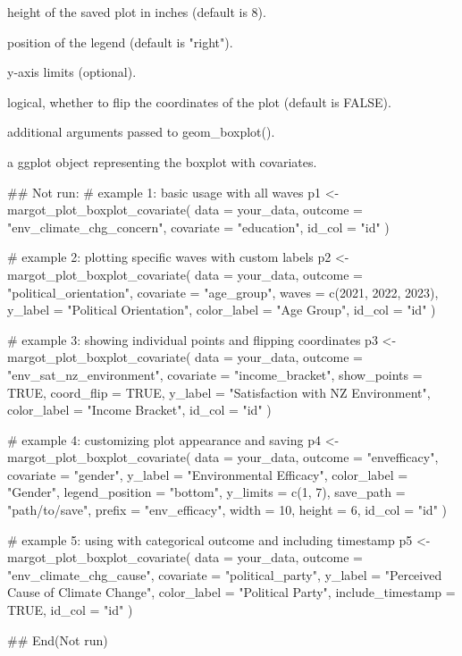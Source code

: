 \documentclass[a4paper]{book}
\begin{document}
\begin{Arguments}
\begin{ldescription}
\item[\code{height}] height of the saved plot in inches (default is 8).

\item[\code{legend\_position}] position of the legend (default is "right").

\item[\code{y\_limits}] y-axis limits (optional).

\item[\code{coord\_flip}] logical, whether to flip the coordinates of the plot (default is FALSE).

\item[\code{...}] additional arguments passed to geom\_boxplot().
\end{ldescription}
\end{Arguments}
%
\begin{Value}
a ggplot object representing the boxplot with covariates.
\end{Value}
%
\begin{Examples}
\begin{ExampleCode}
## Not run: 
# example 1: basic usage with all waves
p1 <- margot_plot_boxplot_covariate(
  data = your_data,
  outcome = "env_climate_chg_concern",
  covariate = "education",
  id_col = "id"
)

# example 2: plotting specific waves with custom labels
p2 <- margot_plot_boxplot_covariate(
  data = your_data,
  outcome = "political_orientation",
  covariate = "age_group",
  waves = c(2021, 2022, 2023),
  y_label = "Political Orientation",
  color_label = "Age Group",
  id_col = "id"
)

# example 3: showing individual points and flipping coordinates
p3 <- margot_plot_boxplot_covariate(
  data = your_data,
  outcome = "env_sat_nz_environment",
  covariate = "income_bracket",
  show_points = TRUE,
  coord_flip = TRUE,
  y_label = "Satisfaction with NZ Environment",
  color_label = "Income Bracket",
  id_col = "id"
)

# example 4: customizing plot appearance and saving
p4 <- margot_plot_boxplot_covariate(
  data = your_data,
  outcome = "envefficacy",
  covariate = "gender",
  y_label = "Environmental Efficacy",
  color_label = "Gender",
  legend_position = "bottom",
  y_limits = c(1, 7),
  save_path = "path/to/save",
  prefix = "env_efficacy",
  width = 10,
  height = 6,
  id_col = "id"
)

# example 5: using with categorical outcome and including timestamp
p5 <- margot_plot_boxplot_covariate(
  data = your_data,
  outcome = "env_climate_chg_cause",
  covariate = "political_party",
  y_label = "Perceived Cause of Climate Change",
  color_label = "Political Party",
  include_timestamp = TRUE,
  id_col = "id"
)

## End(Not run)
\end{ExampleCode}
\end{Examples}
\end{document}
